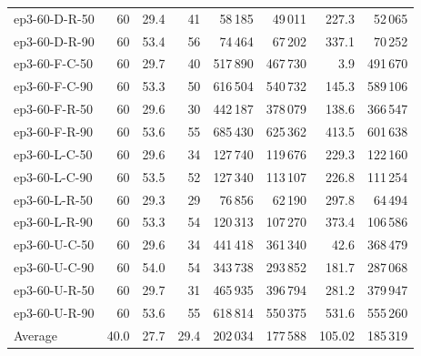 \begin{longtable}{lrrrrrrr}
  ep3-60-D-R-50 & 60 & 29.4 & 41 & 58\,185 & 49\,011 & 227.3 & 52\,065 \\
  ep3-60-D-R-90 & 60 & 53.4 & 56 & 74\,464 & 67\,202 & 337.1 & 70\,252 \\
  ep3-60-F-C-50 & 60 & 29.7 & 40 & 517\,890 & 467\,730 & 3.9 & 491\,670 \\
  ep3-60-F-C-90 & 60 & 53.3 & 50 & 616\,504 & 540\,732 & 145.3 & 589\,106 \\
  ep3-60-F-R-50 & 60 & 29.6 & 30 & 442\,187 & 378\,079 & 138.6 & 366\,547 \\
  ep3-60-F-R-90 & 60 & 53.6 & 55 & 685\,430 & 625\,362 & 413.5 & 601\,638 \\
  ep3-60-L-C-50 & 60 & 29.6 & 34 & 127\,740 & 119\,676 & 229.3 & 122\,160 \\
  ep3-60-L-C-90 & 60 & 53.5 & 52 & 127\,340 & 113\,107 & 226.8 & 111\,254 \\
  ep3-60-L-R-50 & 60 & 29.3 & 29 & 76\,856 & 62\,190 & 297.8 & 64\,494 \\
  ep3-60-L-R-90 & 60 & 53.3 & 54 & 120\,313 & 107\,270 & 373.4 & 106\,586 \\
  ep3-60-U-C-50 & 60 & 29.6 & 34 & 441\,418 & 361\,340 & 42.6 & 368\,479 \\
  ep3-60-U-C-90 & 60 & 54.0 & 54 & 343\,738 & 293\,852 & 181.7 & 287\,068 \\
  ep3-60-U-R-50 & 60 & 29.7 & 31 & 465\,935 & 396\,794 & 281.2 & 379\,947 \\
  ep3-60-U-R-90 & 60 & 53.6 & 55 & 618\,814 & 550\,375 & 531.6 & 555\,260 \\
  \midrule
  Average & 40.0 & 27.7 & 29.4 & 202\,034 & 177\,588 & 105.02 & 185\,319 \\
\end{longtable}
